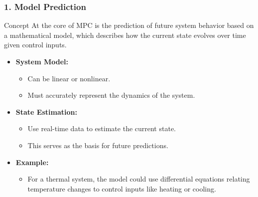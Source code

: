 \documentclass[aspectratio=169]{beamer}
\begin{document}
\begin{frame}[fragile]
    \frametitle{1. Model Prediction}
    \begin{block}{Concept}
        At the core of MPC is the prediction of future system behavior based on a mathematical model, which describes how the current state evolves over time given control inputs.
    \end{block}
    \begin{itemize}
        \item \textbf{System Model:} 
            \begin{itemize}
                \item Can be linear or nonlinear.
                \item Must accurately represent the dynamics of the system.
            \end{itemize}
        \item \textbf{State Estimation:} 
            \begin{itemize}
                \item Use real-time data to estimate the current state.
                \item This serves as the basis for future predictions.
            \end{itemize}
        \item \textbf{Example:} 
            \begin{itemize}
                \item For a thermal system, the model could use differential equations relating temperature changes to control inputs like heating or cooling.
            \end{itemize}
    \end{itemize}
\end{frame}
\end{document}
